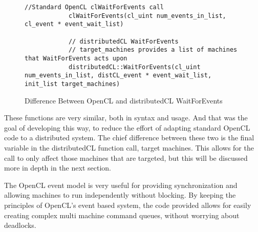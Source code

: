 \documentclass[../thesis.tex]{subfiles}
\begin{document}
        \begin{figure}[htbp]
            \centering
            \lstset{language=cpp}
            \begin{lstlisting}[tabsize=2]
            //Standard OpenCL clWaitForEvents call
            clWaitForEvents(cl_uint num_events_in_list, cl_event * event_wait_list)
            
            // distributedCL WaitForEvents
            // target_machines provides a list of machines that WaitForEvents acts upon
            distributedCL::WaitForEvents(cl_uint num_events_in_list, distCL_event * event_wait_list, init_list target_machines)
            \end{lstlisting}
            \caption{Difference Between OpenCL and distributedCL WaitForEvents}
            \label{fig:difference_between_wait_cl_and_wait_distCL}
        \end{figure}

        These functions are very similar, both in syntax and usage. And that was the goal of developing this way, to reduce the effort of adapting standard OpenCL code to a distributed system. The chief difference between these two is the final variable in the distributedCL function call, target machines. This allows for the call to only affect those machines that are targeted, but this will be discussed more in depth in the next section.

The OpenCL event model is very useful for providing synchronization and allowing machines to run independently without blocking. By keeping the principles of OpenCL's event based system, the code provided allows for easily creating complex multi machine command queues, without worrying about deadlocks.

\end{document}
